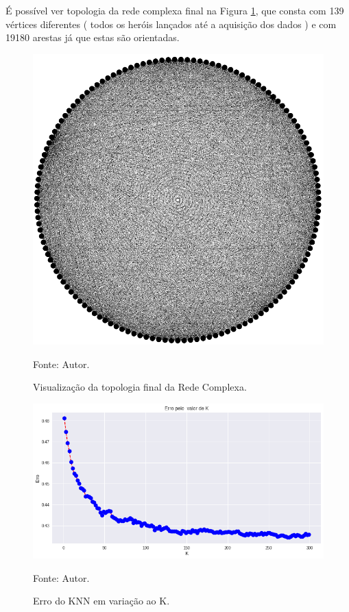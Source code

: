 É possível ver topologia da rede complexa final na Figura \ref{fig:cnfinal}, que consta com 139 vértices diferentes ( todos os heróis lançados até a aquisição dos dados ) e com 19180 arestas já que estas são orientadas.

\begin{figure}[H]
	\caption{Visualização da topologia final da Rede Complexa.}
	\begin{center}
		\includegraphics[width=1\textwidth]{imagens/grafofinal.png}
	\end{center}
	\small{Fonte: Autor.}
	\label{fig:cnfinal}
\end{figure}

\begin{figure}[H]
	\caption{Erro do KNN em variação ao K.}
	\begin{center}
		\includegraphics[width=1\textwidth]{imagens/knn.png}
	\end{center}
	\small{Fonte: Autor.}
	\label{fig:KNNgrafico}
\end{figure}


